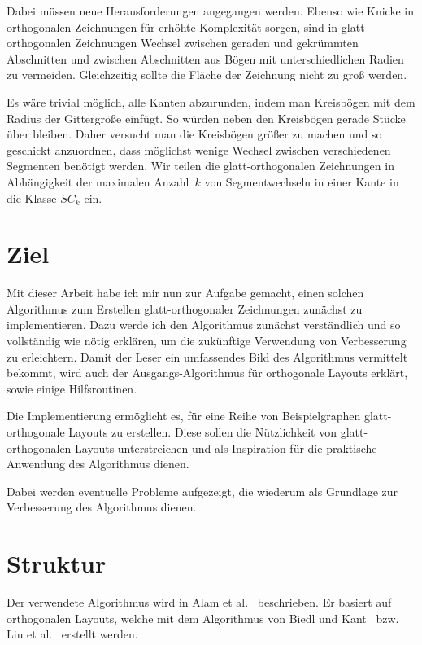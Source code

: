 \documentclass[a4paper]{scrreprt}
\theoremstyle{definition}
\newcommand{\go}{glatt-or\-tho\-go\-nal}
\begin{document}
Dabei müssen neue Herausforderungen angegangen werden. Ebenso wie Knicke in orthogonalen Zeichnungen für erhöhte Komplexität sorgen, sind in glatt-orthogonalen Zeichnungen Wechsel zwischen geraden und gekrümmten Abschnitten und zwischen Abschnitten aus Bögen mit unterschiedlichen Radien zu vermeiden. Gleichzeitig sollte die Fläche der Zeichnung nicht zu groß werden.

Es wäre trivial möglich, alle Kanten abzurunden, indem man Kreisbögen mit dem Radius der Gittergröße einfügt. So würden neben den Kreisbögen gerade Stücke über bleiben. Daher versucht man die Kreisbögen größer zu machen und so geschickt anzuordnen, dass möglichst wenige Wechsel zwischen verschiedenen Segmenten benötigt werden. Wir teilen die glatt-orthogonalen Zeichnungen in Abhängigkeit der maximalen Anzahl~$k$ von Segmentwechseln in einer Kante in die Klasse $SC_k$ ein. 

\section{Ziel}

Mit dieser Arbeit habe ich mir nun zur Aufgabe gemacht, einen solchen Algorithmus zum Erstellen glatt-orthogonaler Zeichnungen zunächst zu implementieren. Dazu werde ich den Algorithmus zunächst verständlich und so vollständig wie nötig erklären, um die zukünftige Verwendung von Verbesserung zu erleichtern. Damit der Leser ein umfassendes Bild des Algorithmus vermittelt bekommt, wird auch der Ausgangs-Algorithmus für orthogonale Layouts erklärt, sowie einige Hilfsroutinen. 

Die Implementierung ermöglicht es, für eine Reihe von Beispielgraphen \go e Layouts zu erstellen. Diese sollen die Nützlichkeit von glatt-orthogonalen Layouts unterstreichen und als Inspiration für die praktische Anwendung des Algorithmus dienen.

Dabei werden eventuelle Probleme aufgezeigt, die wiederum als Grundlage zur Verbesserung des Algorithmus dienen. 

\section{Struktur}


Der verwendete Algorithmus wird in Alam et al.~\cite{smooth-13} beschrieben. Er basiert auf orthogonalen
Layouts, welche mit dem Algorithmus von Biedl und Kant~\cite{biedl+kant-98} bzw. Liu et al.~\cite{liu+etal-98} erstellt
werden.
\end{document}
